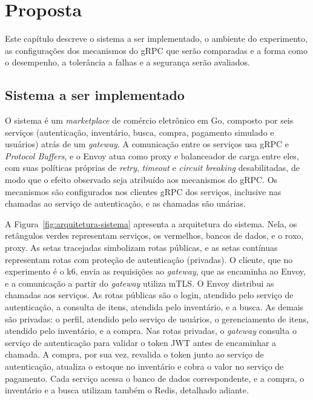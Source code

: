 
\chapter{Proposta}\label{cap:proposta}

Este capítulo descreve o sistema a ser implementado, o ambiente do experimento,
as configurações dos mecanismos do gRPC que serão comparadas e a forma como o
desempenho, a tolerância a falhas e a segurança serão avaliados.

\section{Sistema a ser implementado}\label{sec:sistema}

O sistema é um \textit{marketplace} de comércio eletrônico em Go, composto por seis serviços
(autenticação, inventário, busca, compra, pagamento simulado e usuários) atrás de um
\textit{gateway}. A comunicação entre os serviços usa gRPC e \textit{Protocol Buffers}, e o Envoy
atua como proxy e balanceador de carga entre eles, com suas políticas próprias de \textit{retry},
\textit{timeout} e \textit{circuit breaking} desabilitadas, de modo que o efeito observado seja
atribuído aos mecanismos do gRPC. Os mecanismos são configurados nos clientes gRPC dos serviços,
inclusive nas chamadas ao serviço de autenticação, e as chamadas são unárias.

A Figura~\ref{fig:arquitetura-sistema} apresenta a arquitetura do sistema. Nela, os retângulos verdes
representam serviços, os vermelhos, bancos de dados, e o roxo, proxy. As setas tracejadas
simbolizam rotas públicas, e as setas contínuas representam rotas com proteção de autenticação
(privadas). O cliente, que no experimento é o k6, envia as requisições ao \textit{gateway}, que as
encaminha ao Envoy, e a comunicação a partir do \textit{gateway} utiliza mTLS. O Envoy
distribui as chamadas aos serviços. As rotas públicas são o login, atendido pelo serviço de
autenticação, a consulta de itens, atendida pelo inventário, e a busca. As demais são privadas: o
perfil, atendido pelo serviço de usuários, o gerenciamento de itens, atendido pelo inventário, e a
compra. Nas rotas privadas, o \textit{gateway} consulta o serviço de autenticação para validar o token JWT
antes de encaminhar a chamada. A compra, por sua vez, revalida o token junto ao serviço de autenticação,
atualiza o estoque no inventário e cobra o valor no serviço de pagamento. Cada serviço acessa o
banco de dados correspondente, e a compra, o inventário e a busca utilizam também o Redis, detalhado adiante.

